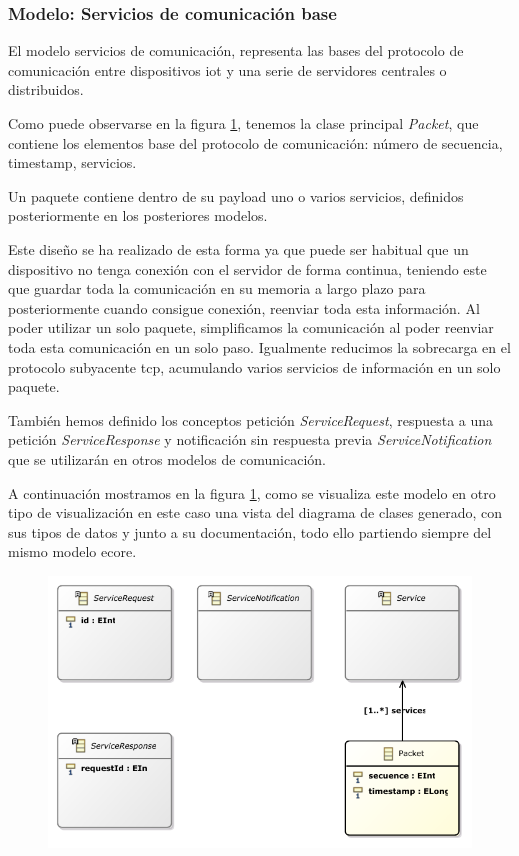 \subsubsection{Modelo: Servicios de comunicación base}

El modelo servicios de comunicación, representa las bases del protocolo de comunicación entre dispositivos \gls{iot} y una serie de servidores centrales o distribuidos.

Como puede observarse en la figura \ref{fig:modelo_servicios_comunicacion_classes}, tenemos la clase principal \textit{Packet}, que contiene los elementos base del protocolo de comunicación: número de secuencia, \gls{timestamp}, servicios.

Un paquete contiene dentro de su \gls{payload} uno o varios servicios, definidos posteriormente en los posteriores modelos.

Este diseño se ha realizado de esta forma ya que puede ser habitual que un dispositivo no tenga conexión con el servidor de forma continua, teniendo este que guardar toda la comunicación en su memoria a largo plazo para posteriormente cuando consigue conexión, reenviar toda esta información.
Al poder utilizar un solo paquete, simplificamos la comunicación al poder reenviar toda esta comunicación en un solo paso.
Igualmente reducimos la sobrecarga en el protocolo subyacente \gls{tcp}, acumulando varios servicios de información en un solo paquete.

También hemos definido los conceptos petición \textit{ServiceRequest}, respuesta a una petición \textit{ServiceResponse} y notificación sin respuesta previa \textit{ServiceNotification} que se utilizarán en otros modelos de comunicación.

A continuación mostramos en la figura \ref{fig:modelo_servicios_comunicacion_classes}, como se visualiza este modelo en otro tipo de visualización en este caso una vista del diagrama de clases generado, con sus tipos de datos y junto a su documentación, todo ello partiendo siempre del mismo modelo \gls{ecore}. 

\begin{figure}
	\centering
    \includegraphics[height=0.3\textheight]{images/models/communications_class_diagram.pdf}
    \label{fig:modelo_servicios_comunicacion_classes}
\end{figure}
